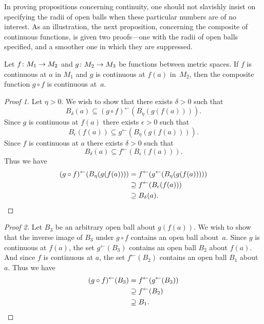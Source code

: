 In proving propositions concerning continuity, one should not slavishly insist on specifying
the radii of open balls when these particular numbers are of no interest. As an illustration,
the next proposition, concerning the composite of continuous functions, is given two
proofs---one with the radii of open balls specified, and a smoother one in which they are
suppressed.

\begin{prop} Let $f\colon M_1 \rightarrow M_2$ and $g\colon M_2 \rightarrow M_3$ be functions between
metric spaces. If $f$ is continuous at $a$ in $M_1$ and $g$ is continuous at $f(a)$
in~$M_2$, then the composite function $g \circ f$ is continuous at~$a$.
\end{prop}

\begin{proof}[Proof 1] Let $\eta > 0$.  We wish to show that there
exists $\delta > 0$ such that
  \[B_\delta(a) \subseteq (g \circ f)^\gets(B_\eta(g(f(a)))). \]
Since $g$ is continuous at $f(a)$ there exists $\epsilon > 0$ such
that
  \[B_\epsilon(f(a)) \subseteq g^\gets(B_\eta(g(f(a)))). \]
Since $f$ is continuous at $a$ there exists $\delta > 0$ such that
  \[B_\delta(a) \subseteq  f^\gets(B_\epsilon(f(a))).\]
Thus we have
  \begin{align*} (g \circ f)^\gets(B_\eta(g(f(a))))
                  &= f^\gets(g^\gets(B_\eta(g(f(a))))) \\
                  &\supseteq f^\gets(B_\epsilon(f(a))) \\
                  &\supseteq B_\delta(a).  \qedhere
  \end{align*}
\end{proof}

\begin{proof}[Proof 2] Let $B_3$ be an arbitrary open ball about
$g(f(a))$. We wish to show that the inverse image of $B_3$ under $g
\circ f$ contains an open ball about~$a$.  Since $g$ is continuous
at $f(a)$, the set $g^\gets(B_3)$ contains an open ball $B_2$ about
$f(a)$. And since $f$ is continuous at $a$, the set $f^\gets(B_2)$
contains an open ball $B_1$ about $a$. Thus we have
  \begin{align*} (g \circ f)^\gets(B_3)
              &= f^\gets(g^\gets(B_3)) \\
              &\supseteq f^\gets(B_2) \\
              &\supseteq B_1.   \qedhere
  \end{align*}
\end{proof}

